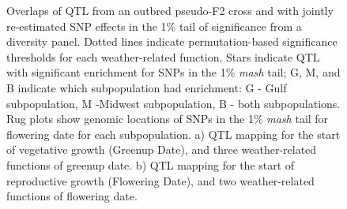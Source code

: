 \documentclass[
  9pt,
  twocolumn,
  twoside]{pnas-new}
\begin{document}
\begin{figure}


\caption{\label{fig-qtl}Overlaps of QTL from an outbred pseudo-F2 cross
and with jointly re-estimated SNP effects in the 1\% tail of
significance from a diversity panel. Dotted lines indicate
permutation-based significance thresholds for each weather-related
function. Stars indicate QTL with significant enrichment for SNPs in the
1\% \emph{mash} tail; G, M, and B indicate which subpopulation had
enrichment: G - Gulf subpopulation, M -Midwest subpopulation, B - both
subpopulations. Rug plots show genomic locations of SNPs in the 1\%
\emph{mash} tail for flowering date for each subpopulation. a) QTL
mapping for the start of vegetative growth (Greenup Date), and three
weather-related functions of greenup date. b) QTL mapping for the start
of reproductive growth (Flowering Date), and two weather-related
functions of flowering date.}

\end{figure}%
\end{document}
